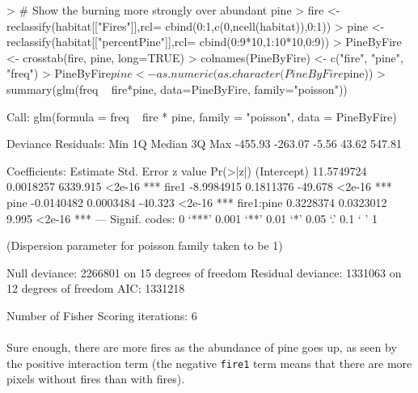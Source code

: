 \documentclass{article}
\begin{document}
\begin{Schunk}
\begin{Sinput}
> # Show the burning more strongly over abundant pine
> fire <- reclassify(habitat[["Fires"]],rcl= cbind(0:1,c(0,ncell(habitat)),0:1))
> pine <- reclassify(habitat[["percentPine"]],rcl= cbind(0:9*10,1:10*10,0:9))
> PineByFire <- crosstab(fire, pine, long=TRUE)
> colnames(PineByFire) <- c("fire", "pine", "freq")
> PineByFire$pine <- as.numeric(as.character(PineByFire$pine))
> summary(glm(freq ~ fire*pine, data=PineByFire, family="poisson"))
\end{Sinput}
\begin{Soutput}
Call:
glm(formula = freq ~ fire * pine, family = "poisson", data = PineByFire)

Deviance Residuals: 
    Min       1Q   Median       3Q      Max  
-455.93  -263.07    -5.56    43.62   547.81  

Coefficients:
              Estimate Std. Error  z value Pr(>|z|)    
(Intercept) 11.5749724  0.0018257 6339.915   <2e-16 ***
fire1       -8.9984915  0.1811376  -49.678   <2e-16 ***
pine        -0.0140482  0.0003484  -40.323   <2e-16 ***
fire1:pine   0.3228374  0.0323012    9.995   <2e-16 ***
---
Signif. codes:  0 ‘***’ 0.001 ‘**’ 0.01 ‘*’ 0.05 ‘.’ 0.1 ‘ ’ 1

(Dispersion parameter for poisson family taken to be 1)

    Null deviance: 2266801  on 15  degrees of freedom
Residual deviance: 1331063  on 12  degrees of freedom
AIC: 1331218

Number of Fisher Scoring iterations: 6
\end{Soutput}
\end{Schunk}

\paragraph{}
Sure enough, there are more fires as the abundance of pine goes up, as seen by the positive interaction term (the negative \texttt{fire1} term means that there are more pixels without fires than with fires).
\end{document}
